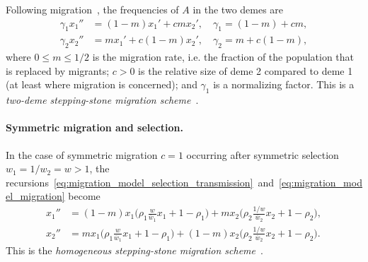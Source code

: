 \documentclass[14pt]{extarticle}
\begin{document}
Following migration~\citep{Karlin1981}, the frequencies of $A$ in the two demes are
\begin{equation} \label{eq:migration_model_migration}
\begin{aligned}
\gamma_1 x_1'' &= (1-m) x_1' + c m x_2', \quad \gamma_1 = (1-m) + c m, \\
\gamma_2 x_2'' &= m x_1' + c (1-m) x_2', \quad \gamma_2 = m + c (1-m),
\end{aligned}
\end{equation}
where $0 \le m \le 1/2$ is the migration rate, i.e. the fraction of the population that is replaced by migrants; $c>0$ is the relative size of deme 2 compared to deme 1 (at least where migration is concerned); and $\gamma_1$ is a normalizing factor.
This is a \emph{two-deme stepping-stone migration scheme}~\citep[][eqs.~2.15-16]{Karlin1982}.

\paragraph{Symmetric migration and selection.}

 
In the case of symmetric migration $c=1$ occurring after symmetric selection $w_1=1/w_2=w>1$, the recursions~\eqref{eq:migration_model_selection_transmission}~and~\eqref{eq:migration_model_migration} become
\begin{equation}\begin{aligned} \label{eq:migration_model_unconditional_symmetric}
x_1'' &= (1-m)x_1\Big(\rho_1 \frac{w}{\overline w_1} x_1 + 1-\rho_1 \Big) + m x_2\Big(\rho_2 \frac{1/w}{\overline w_2} x_2 + 1-\rho_2 \Big), \\
x_2'' &= m x_1\Big(\rho_1 \frac{w}{\overline w_1} x_1 + 1-\rho_1 \Big) + (1-m) x_2\Big(\rho_2 \frac{1/w}{\overline w_2} x_2 + 1-\rho_2 \Big).
\end{aligned}
\end{equation}
This is the \emph{homogeneous stepping-stone migration scheme}~\citep[][eq.~2.14]{Karlin1982}.
\end{document}
